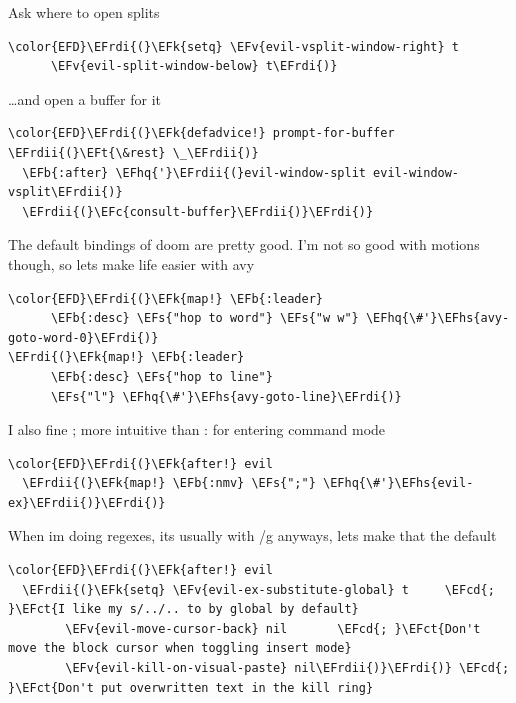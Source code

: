 \documentclass{scrartcl}
\newcommand{\EFk}[1]{\textcolor{EFk}{#1}} %
\newcommand{\EFt}[1]{\textcolor{EFt}{#1}} %
\newcommand{\EFs}[1]{\textcolor{EFs}{#1}} %
\newcommand{\EFb}[1]{\textcolor{EFb}{#1}} %
\newcommand{\EFct}[1]{\textcolor{EFct}{#1}} %
\newcommand{\EFc}[1]{\textcolor{EFc}{#1}} %
\newcommand{\EFv}[1]{\textcolor{EFv}{#1}} %
\newcommand{\EFcd}[1]{\textcolor{EFcd}{#1}} %
\newcommand{\EFhq}[1]{\textcolor{EFhq}{#1}} %
\newcommand{\EFhs}[1]{\textcolor{EFhs}{#1}} %
\newcommand{\EFrdi}[1]{\textcolor{EFrdi}{#1}} %
\newcommand{\EFrdii}[1]{\textcolor{EFrdii}{#1}} %
\begin{document}
Ask where to open splits
\begin{Code}
\begin{Verbatim}[]
\color{EFD}\EFrdi{(}\EFk{setq} \EFv{evil-vsplit-window-right} t
      \EFv{evil-split-window-below} t\EFrdi{)}
\end{Verbatim}
\end{Code}

\ldots{}and open a buffer for it
\begin{Code}
\begin{Verbatim}[]
\color{EFD}\EFrdi{(}\EFk{defadvice!} prompt-for-buffer \EFrdii{(}\EFt{\&rest} \_\EFrdii{)}
  \EFb{:after} \EFhq{'}\EFrdii{(}evil-window-split evil-window-vsplit\EFrdii{)}
  \EFrdii{(}\EFc{consult-buffer}\EFrdii{)}\EFrdi{)}
\end{Verbatim}
\end{Code}

The default bindings of doom are pretty good. I'm not so good with motions though, so lets make life easier with avy
\begin{Code}
\begin{Verbatim}[]
\color{EFD}\EFrdi{(}\EFk{map!} \EFb{:leader}
      \EFb{:desc} \EFs{"hop to word"} \EFs{"w w"} \EFhq{\#'}\EFhs{avy-goto-word-0}\EFrdi{)}
\EFrdi{(}\EFk{map!} \EFb{:leader}
      \EFb{:desc} \EFs{"hop to line"}
      \EFs{"l"} \EFhq{\#'}\EFhs{avy-goto-line}\EFrdi{)}
\end{Verbatim}
\end{Code}

I also fine ; more intuitive than : for entering command mode
\begin{Code}
\begin{Verbatim}[]
\color{EFD}\EFrdi{(}\EFk{after!} evil
  \EFrdii{(}\EFk{map!} \EFb{:nmv} \EFs{";"} \EFhq{\#'}\EFhs{evil-ex}\EFrdii{)}\EFrdi{)}
\end{Verbatim}
\end{Code}

When im doing regexes, its usually with /g anyways, lets make that the default
\begin{Code}
\begin{Verbatim}[]
\color{EFD}\EFrdi{(}\EFk{after!} evil
  \EFrdii{(}\EFk{setq} \EFv{evil-ex-substitute-global} t     \EFcd{; }\EFct{I like my s/../.. to by global by default}
        \EFv{evil-move-cursor-back} nil       \EFcd{; }\EFct{Don't move the block cursor when toggling insert mode}
        \EFv{evil-kill-on-visual-paste} nil\EFrdii{)}\EFrdi{)} \EFcd{; }\EFct{Don't put overwritten text in the kill ring}
\end{Verbatim}
\end{Code}
\end{document}
